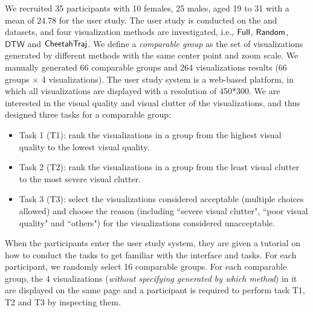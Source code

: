  We recruited 35 participants with 10 females, 25 males, aged 19 to 31 with a mean of 24.78 for the user study. The user study is conducted on the \pt{} and \sz{} datasets, and four visualization methods are investigated, i.e., $\mathsf{Full}$, $\mathsf{Random}$, $\mathsf{DTW}$ and $\mathsf{CheetahTraj}$. We define a \textit{comparable group} as the set of visualizations generated by different methods with the same center point and zoom scale. We manually generated 66 comparable groups and 264 visualizations results (66 groups $\times$ 4 visualizations). The user study system is a web-based platform, in which all visualizations are displayed with a resolution of 450*300. We are interested in the visual quality and visual clutter of the visualizations, and thus designed three tasks for a comparable group:
\begin{itemize}
	\item Task 1 (T1): rank the visualizations in a group from the highest visual quality to the lowest visual quality. %
	\item Task 2 (T2): rank the visualizations in a group from the least visual clutter to the most severe visual clutter. %
	\item Task 3 (T3): select the visualizations considered acceptable (multiple choices allowed) and choose the reason (including ``severe visual clutter", ``poor visual quality" and ``others") for the visualizations considered unacceptable. 
\end{itemize}


When the participants enter the user study system, they are given a tutorial on how to conduct the tasks to get familiar with the interface and tasks.
For each participant, we randomly select 16 comparable groups.
For each comparable group, the 4 visualizations (\textit{without specifying generated by which method}) in it are displayed on the same page and a participant is required to perform task T1, T2 and T3 by inspecting them.



